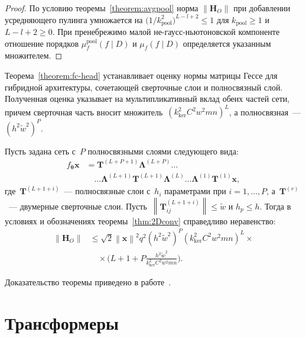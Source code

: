 \begin{proof}
По условию теоремы~\ref{theorem:avgpool} норма $\|\mathbf{H}_O\|$ при добавлении усредняющего пулинга умножается на $\bigl(1/k_{\mathrm{pool}}^2\bigr)^{L-l+2}\le 1$ для $k_{\mathrm{pool}}\ge 1$ и $L-l+2\ge 0$.
При пренебрежимо малой не-гаусс-ньютоновской компоненте отношение порядков $\mu_f^{\mathrm{pool}}(f\mid D)$ и $\mu_f(f\mid D)$ определяется указанным множителем. \end{proof}

Теорема~\ref{theorem:fc-head} устанавливает оценку нормы матрицы Гессе для гибридной архитектуры, сочетающей сверточные слои и полносвязный слой.
Полученная оценка указывает на мультипликативный вклад обеих частей сети, причем сверточная часть вносит множитель~$(k_{\mathrm{ker}}^2C^2w^2mn)^L$, а полносвязная~--- $(h^2\tilde{w}^2)^P$.

\begin{theorem}\label{theorem:fc-head}
Пусть задана сеть с~$P$ полносвязными слоями следующего вида:
\begin{align}
    f_{\boldsymbol{\theta}}{\mathbf{x}} &= \mathbf{T}^{(L+P+1)}\boldsymbol{\Lambda}^{(L+P)} \dots \\
    &\quad\dots \boldsymbol{\Lambda}^{(L+1)}\mathbf{T}^{(L+1)}\boldsymbol{\Lambda}^{(L)}\dots \boldsymbol{\Lambda}^{(1)}\mathbf{T}^{(1)}\mathbf{x},
\end{align}
где~$\mathbf{T}^{(L+1+i)}$~--- полносвязные слои с~$h_{i}$ параметрами при $i=1,\dots,P$, а~$\mathbf{T}^{(r)}$~--- двумерные сверточные слои.
Пусть~$\left\|\mathbf{T}^{(L+1+i)}_{ij}\right\| \leqslant \tilde{w}$ и $h_p \leqslant h$.
Тогда в условиях и обозначениях теоремы~\ref{thm:2Dconv} справедливо неравенство:
\begin{align}
    \left\|\mathbf{H}_{O}\right\| &\leqslant \sqrt{2}\left\|\mathbf{x}\right\|^2q^2(h^2\tilde{w}^2)^P(k_{\mathrm{ker}}^2C^2w^2mn)^L\times \\
    &\quad\times \big(L + 1 + P\frac{h^2\tilde{w}^2}{k_{\mathrm{ker}}^2C^2w^2mn}\big).
\end{align}
\end{theorem}
Доказательство теоремы приведено в работе~\cite{grabovoi2024convnets743111032}.

\section{Трансформеры}\label{chapter:gesian:transformer}

